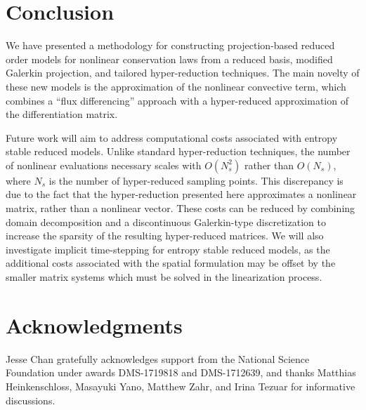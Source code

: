 \documentclass[preprint,10pt]{elsarticle}
\theoremstyle{definition}
\theoremstyle{lemma}
\theoremstyle{theorem}
\theoremstyle{assumption}
\newcommand{\note}[1]{{\color{blue}{#1}}}
\begin{document}



\section{Conclusion}  We have presented a methodology for constructing projection-based reduced order models for nonlinear conservation laws from a reduced basis, modified Galerkin projection, and tailored hyper-reduction techniques.  The main novelty of these new models is the approximation of the nonlinear convective term, which combines a ``flux differencing'' approach with a hyper-reduced approximation of the differentiation matrix.  

Future work will aim to address computational costs associated with entropy stable reduced models.  Unlike standard hyper-reduction techniques, the number of nonlinear evaluations necessary scales with $O(N_s^2)$ rather than $O(N_s)$, where $N_s$ is the number of hyper-reduced sampling points.  This discrepancy is due to the fact that the hyper-reduction presented here approximates a nonlinear matrix, rather than a nonlinear vector.  These costs can be reduced by combining domain decomposition \cite{lucia2003reduced} and a discontinuous Galerkin-type discretization \cite{chan2017discretely} to increase the sparsity of the resulting hyper-reduced matrices.  We will also investigate implicit time-stepping for entropy stable reduced models, as the additional costs associated with the spatial formulation may be offset by the smaller matrix systems which must be solved in the linearization process.

\section{Acknowledgments}

Jesse Chan gratefully acknowledges support from the National Science Foundation under awards DMS-1719818 and DMS-1712639, and thanks Matthias Heinkenschloss, Masayuki Yano, Matthew Zahr, and Irina Tezuar for informative discussions.



\end{document}
